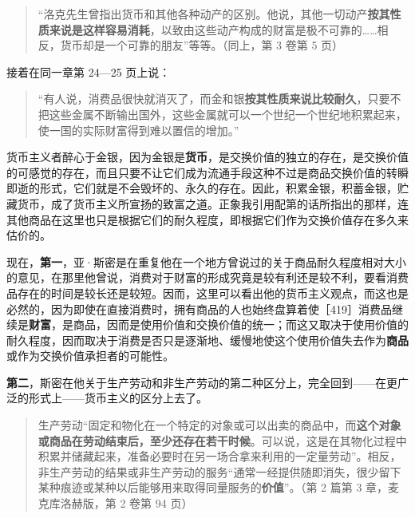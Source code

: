 \begin{quote}“洛克先生曾指出货币和其他各种动产的区别。他说，其他一切动产\textbf{按其性质来说是这样容易消耗}，以致由这些动产构成的财富是极不可靠的……相反，货币却是一个可靠的朋友”等等。（同上，第 3 卷第 5 页）\end{quote}

接着在同一章第 24—25 页上说：

\begin{quote}“有人说，消费品很快就消灭了，而金和银\textbf{按其性质来说比较耐久}，只要不把这些金属不断输出国外，这些金属就可以一个世纪一个世纪地积累起来，使一国的实际财富得到难以置信的增加。”\end{quote}

货币主义者醉心于金银，因为金银是\textbf{货币}，是交换价值的独立的存在，是交换价值的可感觉的存在，而且只要不让它们成为流通手段这种不过是商品交换价值的转瞬即逝的形式，它们就是不会毁坏的、永久的存在。因此，积累金银，积蓄金银，贮藏货币，成了货币主义所宣扬的致富之道。正象我引用配第的话所指出的那样，连其他商品在这里也只是根据它们的耐久程度，即根据它们作为交换价值存在多久来估价的。

现在，\textbf{第一}，亚·斯密是在重复他在一个地方曾说过的关于商品耐久程度相对大小的意见，在那里他曾说，消费对于财富的形成究竟是较有利还是较不利，要看消费品存在的时间是较长还是较短。因而，这里可以看出他的货币主义观点，而这也是必然的，因为即使在直接消费时，拥有商品的人也始终盘算着使［419］消费品继续是\textbf{财富}，是商品，因而是使用价值和交换价值的统一；而这又取决于使用价值的耐久程度，因而取决于消费是否只是逐渐地、缓慢地使这个使用价值失去作为\textbf{商品}或作为交换价值承担者的可能性。

\textbf{第二}，斯密在他关于生产劳动和非生产劳动的第二种区分上，完全回到——在更广泛的形式上——货币主义的区分上去了。

\begin{quote}生产劳动“固定和物化在一个特定的对象或可以出卖的商品中，而\textbf{这个对象或商品在劳动结束后，至少还存在若干时候}。可以说，这是在其物化过程中积累并储藏起来，准备必要时在另一场合拿来利用的一定量劳动”。相反，非生产劳动的结果或非生产劳动的服务“通常一经提供随即消失，很少留下某种痕迹或某种以后能够用来取得同量服务的\textbf{价值}”。（第 2 篇第 3 章，麦克库洛赫版，第 2 卷第 94 页）\end{quote}

